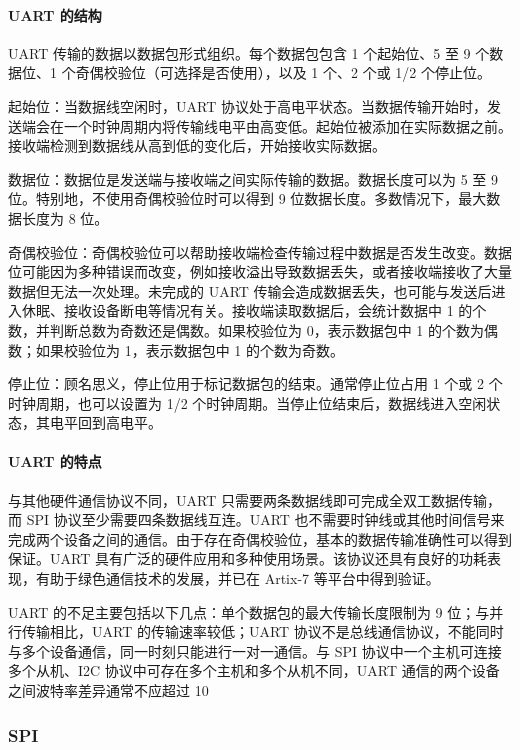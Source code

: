 \documentclass[12pt,a4paper]{article}
\numberwithin{equation}{section}
\begin{document}
\paragraph{UART 的结构}

UART 传输的数据以数据包形式组织。每个数据包包含 1 个起始位、5 至 9 个数据位、1 个奇偶校验位（可选择是否使用），以及 1 个、2 个或 1/2 个停止位。

起始位：当数据线空闲时，UART 协议处于高电平状态。当数据传输开始时，发送端会在一个时钟周期内将传输线电平由高变低。起始位被添加在实际数据之前。接收端检测到数据线从高到低的变化后，开始接收实际数据。

数据位：数据位是发送端与接收端之间实际传输的数据。数据长度可以为 5 至 9 位。特别地，不使用奇偶校验位时可以得到 9 位数据长度。多数情况下，最大数据长度为 8 位。

奇偶校验位：奇偶校验位可以帮助接收端检查传输过程中数据是否发生改变。数据位可能因为多种错误而改变，例如接收溢出导致数据丢失，或者接收端接收了大量数据但无法一次处理。未完成的 UART 传输会造成数据丢失，也可能与发送后进入休眠、接收设备断电等情况有关。接收端读取数据后，会统计数据中 1 的个数，并判断总数为奇数还是偶数。如果校验位为 0，表示数据包中 1 的个数为偶数；如果校验位为 1，表示数据包中 1 的个数为奇数。

停止位：顾名思义，停止位用于标记数据包的结束。通常停止位占用 1 个或 2 个时钟周期，也可以设置为 1/2 个时钟周期。当停止位结束后，数据线进入空闲状态，其电平回到高电平。

\paragraph{UART 的特点}

与其他硬件通信协议不同，UART 只需要两条数据线即可完成全双工数据传输，而 SPI 协议至少需要四条数据线互连。UART 也不需要时钟线或其他时间信号来完成两个设备之间的通信。由于存在奇偶校验位，基本的数据传输准确性可以得到保证。UART 具有广泛的硬件应用和多种使用场景。该协议还具有良好的功耗表现，有助于绿色通信技术的发展，并已在 Artix-7 等平台中得到验证。

UART 的不足主要包括以下几点：单个数据包的最大传输长度限制为 9 位；与并行传输相比，UART 的传输速率较低；UART 协议不是总线通信协议，不能同时与多个设备通信，同一时刻只能进行一对一通信。与 SPI 协议中一个主机可连接多个从机、I2C 协议中可存在多个主机和多个从机不同，UART 通信的两个设备之间波特率差异通常不应超过 10%

\subsubsection*{SPI}
\end{document}
